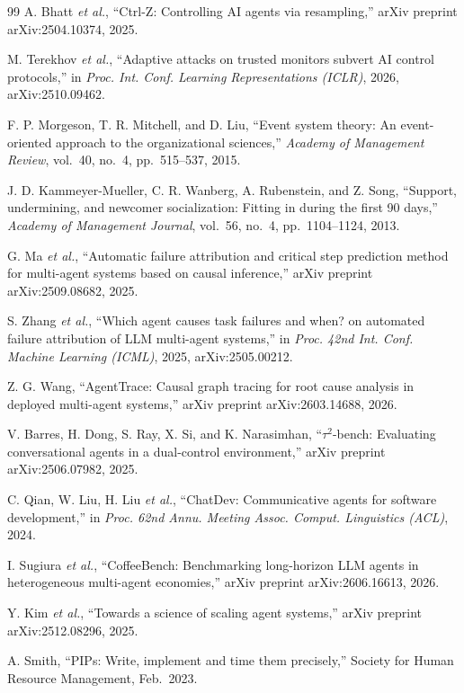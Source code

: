 \documentclass[conference]{IEEEtran}
\begin{document}
\begin{thebibliography}{99}
A. Bhatt \emph{et al.}, ``Ctrl-Z: Controlling AI agents via resampling,'' arXiv
preprint arXiv:2504.10374, 2025.

M. Terekhov \emph{et al.}, ``Adaptive attacks on trusted monitors subvert AI
control protocols,'' in \emph{Proc. Int. Conf. Learning Representations
(ICLR)}, 2026, arXiv:2510.09462.

F. P. Morgeson, T. R. Mitchell, and D. Liu, ``Event system theory: An
event-oriented approach to the organizational sciences,'' \emph{Academy of
Management Review}, vol.~40, no.~4, pp.~515--537, 2015.

J. D. Kammeyer-Mueller, C. R. Wanberg, A. Rubenstein, and Z. Song, ``Support,
undermining, and newcomer socialization: Fitting in during the first 90 days,''
\emph{Academy of Management Journal}, vol.~56, no.~4, pp.~1104--1124, 2013.

G. Ma \emph{et al.}, ``Automatic failure attribution and critical step
prediction method for multi-agent systems based on causal inference,'' arXiv
preprint arXiv:2509.08682, 2025.

S. Zhang \emph{et al.}, ``Which agent causes task failures and when? on
automated failure attribution of LLM multi-agent systems,'' in \emph{Proc. 42nd
Int. Conf. Machine Learning (ICML)}, 2025, arXiv:2505.00212.

Z. G. Wang, ``AgentTrace: Causal graph tracing for root cause analysis in
deployed multi-agent systems,'' arXiv preprint arXiv:2603.14688, 2026.

V. Barres, H. Dong, S. Ray, X. Si, and K. Narasimhan, ``$\tau^2$-bench:
Evaluating conversational agents in a dual-control environment,'' arXiv
preprint arXiv:2506.07982, 2025.

C. Qian, W. Liu, H. Liu \emph{et al.}, ``ChatDev: Communicative agents for
software development,'' in \emph{Proc. 62nd Annu. Meeting Assoc. Comput.
Linguistics (ACL)}, 2024.

I. Sugiura \emph{et al.}, ``CoffeeBench: Benchmarking long-horizon LLM agents in
heterogeneous multi-agent economies,'' arXiv preprint arXiv:2606.16613, 2026.

Y. Kim \emph{et al.}, ``Towards a science of scaling agent systems,'' arXiv
preprint arXiv:2512.08296, 2025.

A. Smith, ``PIPs: Write, implement and time them precisely,'' Society for Human
Resource Management, Feb.~2023.

\end{thebibliography}
\end{document}
